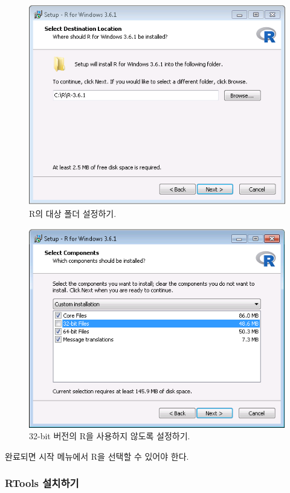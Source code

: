 \documentclass[11pt]{book}
\theoremstyle{definition}
\theoremstyle{definition}
\theoremstyle{definition}
\theoremstyle{remark}
\begin{document}
\begin{figure}

{\centering \includegraphics[width=0.8\linewidth]{images/OhdsiAnalyticsTools/rDestination} 

}

\caption{R의 대상 폴더 설정하기.}\label{fig:rDestination}
\end{figure}

\begin{figure}

{\centering \includegraphics[width=0.8\linewidth]{images/OhdsiAnalyticsTools/no32Bits} 

}

\caption{32-bit 버전의 R을 사용하지 않도록 설정하기.}\label{fig:no32Bits}
\end{figure}

완료되면 시작 메뉴에서 R을 선택할 수 있어야 한다.

\subsubsection*{RTools 설치하기}\label{rtools-}
\end{document}
